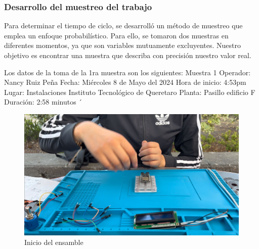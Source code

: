     
    
    
     
     
    \subsubsection{Desarrollo del muestreo del trabajo}
    Para determinar el tiempo de ciclo, se desarrolló un método de muestreo que emplea un enfoque probabilístico. Para ello, se tomaron dos muestras en diferentes momentos, ya que son variables mutuamente excluyentes. Nuestro objetivo es encontrar una muestra que describa con precisión nuestro valor real.
    
    Los datos de la toma de la 1ra muestra son los siguientes:
    \newline
    Muestra 1
    \newline
    Operador: Nancy Ruiz Peña
    \newline
    Fecha: Miércoles 8 de Mayo del 2024
    \newline
    Hora de inicio: 4:53pm
    \newline
    Lugar: Instalaciones Instituto Tecnológico de Queretaro
    \newline
    Planta: Pasillo edificio F
    \newline
    Duración: 2:58 minutos
    \newline
    ´
    \begin{figure}[H]
        \centering
        \includegraphics[scale=0.15]{35/Img/evidenciaM11.jpeg}
        \caption{Inicio del ensamble}
    \end{figure}
    
